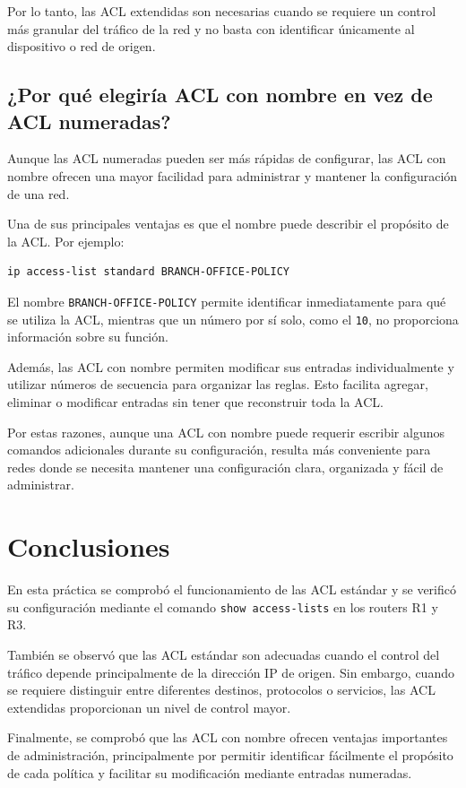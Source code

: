 \documentclass[12pt,a4paper]{article}
\begin{document}
Por lo tanto, las ACL extendidas son necesarias cuando se requiere
un control más granular del tráfico de la red y no basta con
identificar únicamente al dispositivo o red de origen.

\subsection{¿Por qué elegiría ACL con nombre en vez de ACL numeradas?}

Aunque las ACL numeradas pueden ser más rápidas de configurar,
las ACL con nombre ofrecen una mayor facilidad para administrar y
mantener la configuración de una red.

Una de sus principales ventajas es que el nombre puede describir
el propósito de la ACL. Por ejemplo:

\begin{lstlisting}
ip access-list standard BRANCH-OFFICE-POLICY
\end{lstlisting}

El nombre \texttt{BRANCH-OFFICE-POLICY} permite identificar
inmediatamente para qué se utiliza la ACL, mientras que un número
por sí solo, como el \texttt{10}, no proporciona información sobre
su función.

Además, las ACL con nombre permiten modificar sus entradas
individualmente y utilizar números de secuencia para organizar las
reglas. Esto facilita agregar, eliminar o modificar entradas sin
tener que reconstruir toda la ACL.

Por estas razones, aunque una ACL con nombre puede requerir
escribir algunos comandos adicionales durante su configuración,
resulta más conveniente para redes donde se necesita mantener una
configuración clara, organizada y fácil de administrar.

\section{Conclusiones}

En esta práctica se comprobó el funcionamiento de las ACL estándar
y se verificó su configuración mediante el comando
\texttt{show access-lists} en los routers R1 y R3.

También se observó que las ACL estándar son adecuadas cuando el
control del tráfico depende principalmente de la dirección IP de
origen. Sin embargo, cuando se requiere distinguir entre diferentes
destinos, protocolos o servicios, las ACL extendidas proporcionan
un nivel de control mayor.

Finalmente, se comprobó que las ACL con nombre ofrecen ventajas
importantes de administración, principalmente por permitir
identificar fácilmente el propósito de cada política y facilitar
su modificación mediante entradas numeradas.
\end{document}
